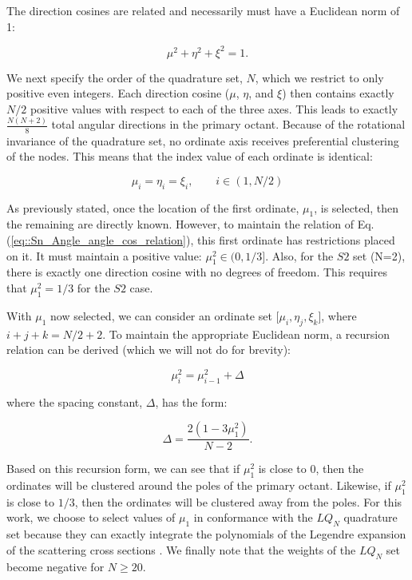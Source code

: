 \noindent The direction cosines are related and necessarily must have a Euclidean norm of 1:

\begin{equation}
\label{eq::Sn_Angle_angle_cos_relation}
\mu^2 + \eta^2 + \xi^2 = 1 .
\end{equation}


We next specify the order of the quadrature set, $N$, which we restrict to only positive even integers. Each direction cosine ($\mu$, $\eta$, and $\xi$) then contains exactly $N/2$ positive values with respect to each of the three axes. This leads to exactly $\frac{N(N+2)}{8}$ total angular directions in the primary octant. Because of the rotational invariance of the quadrature set, no ordinate axis receives preferential clustering of the nodes. This means that the index value of each ordinate is identical: 

\begin{equation}
\label{eq::Sn_Angle_LS_index_values}
\mu_i = \eta_i = \xi_i, \qquad i \in (1,N/2)
\end{equation}

As previously stated, once the location of the first ordinate, $\mu_1$, is selected, then the remaining are directly known. However, to maintain the relation of Eq. (\ref{eq::Sn_Angle_angle_cos_relation}), this first ordinate has restrictions placed on it. It must maintain a positive value: $\mu_1^2 \in (0, 1/3]$. Also, for the $S2$ set (N=2), there is exactly one direction cosine with no degrees of freedom. This requires that $\mu_1^2 = 1/3$ for the $S2$ case.

With $\mu_1$ now selected, we can consider an ordinate set [$\mu_i, \eta_j, \xi_k $], where $i+j+k = N/2 + 2$. To maintain the appropriate Euclidean norm, a recursion relation can be derived (which we will not do for brevity):

\begin{equation}
\label{eq::Sn_Angle_LS_ord_det}
\mu_i^2 = \mu_{i-1}^2 + \Delta
\end{equation}

\noindent where the spacing constant, $\Delta$, has the form:

\begin{equation}
\label{eq::Sn_Angle_LS_ord_det_constant}
 \Delta = \frac{2 (1-3 \mu_1^2)}{N-2}. 
\end{equation}

\noindent Based on this recursion form, we can see that if $\mu_1^2$ is close to 0, then the ordinates will be clustered around the poles of the primary octant. Likewise, if $\mu_1^2$ is close to $1/3$, then the ordinates will be clustered away from the poles. For this work, we choose to select values of $\mu_1$ in conformance with the $LQ_N$ quadrature set because they can exactly integrate the polynomials of the Legendre expansion of the scattering cross sections \cite{carlson1971}. We finally note that the weights of the $LQ_N$ set become negative for $N \geq 20$.

